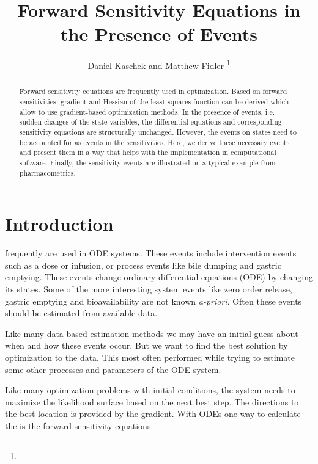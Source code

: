 \documentclass[journal, a4paper]{IEEEtran}
\begin{document}
	\title{Forward Sensitivity Equations in the Presence of Events}
	\author{Daniel Kaschek and Matthew Fidler
	\thanks{}}
	\markboth{}{}
	\maketitle

\begin{abstract}
	Forward sensitivity equations are frequently used in optimization. Based on forward sensitivities, gradient and Hessian of the least squares function can be derived which allow to use gradient-based optimization methods. In the presence of events, i.e. sudden changes of the state variables, the differential equations and corresponding sensitivity equations are structurally unchanged. However, the events on states need to be accounted for as events in the sensitivities. Here, we derive these necessary events and present them in a way that helps with the implementation in computational software. Finally, the sensitivity events are illustrated on a typical example from pharmacometrics.
\end{abstract}

\section{Introduction}
	 frequently are used in ODE systems.  These
	events include intervention events such as a dose
	or infusion, or process events like bile 
	dumping and gastric emptying.  These events change ordinary 
	differential equations (ODE) by changing its states.  Some of 
	the more interesting system events like zero order release, gastric 
	emptying and bioavailability are not known \emph{a-priori}.  Often these 
	events should be estimated from available data.
	
	Like many data-based estimation methods we may have an initial guess about
	when and how these events occur.  But we want to find the best solution
	by optimization to the data. This most often performed while trying to
	estimate some other processes and parameters of the ODE system. 
	
	Like many optimization problems with initial conditions, the system needs 
	to maximize the likelihood surface based on the next best step.  
	The directions to the best location is provided by the gradient.  
	With ODEs one way to calculate the is the forward sensitivity equations.
	
\end{document}
